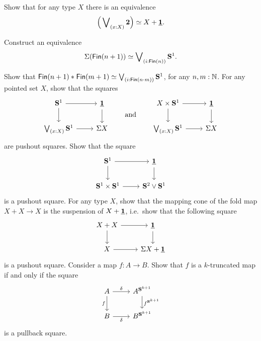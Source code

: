 \begin{exercises}
\begin{subexenum}
\begin{equation*}
\end{equation*}
\item Show that for any type $X$ there is an equivalence
\begin{equation*}
\eqv{\Big(\bigvee\nolimits_{(x:X)}\bool\Big)}{X+\unit}.
\end{equation*}
\item Construct an equivalence
\begin{equation*}
\eqv{\susp(\mathsf{Fin}(n+1))}{\bigvee\nolimits_{(i:\mathsf{Fin}(n))}\sphere{1}}.
\end{equation*}
\end{subexenum}
\exercise Show that $\eqv{\join{\mathsf{Fin}(n+1)}{\mathsf{Fin}(m+1)}}{\bigvee\nolimits_{(i:\mathsf{Fin}(n\cdot m))}\sphere{1}}$, for any $n,m:{\mathbb{N}}$.
\exercise For any pointed set $X$, show that the squares
  \begin{equation*}
    \begin{tikzcd}
      \sphere{1} \arrow[r] \arrow[d] & \unit \arrow[d] \\
      \bigvee_{(x:X)}\sphere{1} \arrow[r] & \susp{X}
    \end{tikzcd}
    \qquad\text{and}\qquad
    \begin{tikzcd}
      X\times \sphere{1} \arrow[d] \arrow[r] & \unit \arrow[d] \\
      \bigvee_{(x:X)}\sphere{1} \arrow[r] & \susp{X}
    \end{tikzcd}
  \end{equation*}
  are pushout squares.
\exercise Show that the square
  \begin{equation*}
    \begin{tikzcd}
      \sphere{1} \arrow[r] \arrow[d] & \unit \arrow[d] \\
      \sphere{1}\times\sphere{1} \arrow[r] & \sphere{2}\vee\sphere{1}
    \end{tikzcd}
  \end{equation*}
  is a pushout square.
\exercise For any type $X$, show that the mapping cone of the fold map $X+X\to X$ is the suspension of $X+\underline{\mathbf{1}}$, i.e.~show that the following square
  \begin{equation*}
    \begin{tikzcd}
      X+X \arrow[d] \arrow[r] & \unit \arrow[d] \\
      X \arrow[r] & \susp{X+\unit}
    \end{tikzcd}
  \end{equation*}
  is a pushout square.
  \exercise Consider a map $f:A\to B$. Show that $f$ is a $k$-truncated map if and only if the square
  \begin{equation*}
    \begin{tikzcd}
      A \arrow[r,"\delta"] \arrow[d,swap,"f"] & A^{\sphere{k+1}} \arrow[d,"f^{\sphere{k+1}}"] \\
      B \arrow[r,swap,"\delta"] & B^{\sphere{k+1}}
    \end{tikzcd}
  \end{equation*}
  is a pullback square.
\end{exercises}
